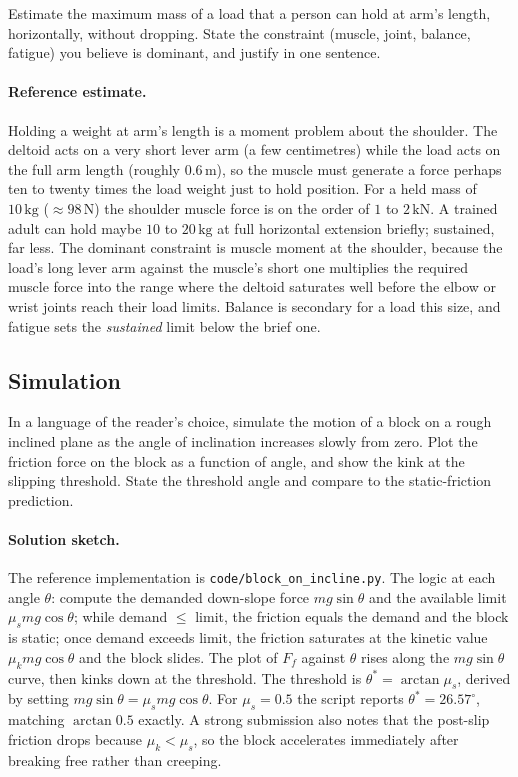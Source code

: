 \begin{exercise}
Estimate the maximum mass of a load that a person can hold at arm's
length, horizontally, without dropping. State the constraint
(muscle, joint, balance, fatigue) you believe is dominant, and
justify in one sentence.
\paragraph{Reference estimate.} Holding a weight at arm's length is a
moment problem about the shoulder. The deltoid acts on a very short
lever arm (a few centimetres) while the load acts on the full arm length
(roughly $0.6\,\si{\meter}$), so the muscle must generate a force perhaps
ten to twenty times the load weight just to hold position. For a held
mass of $10\,\si{\kilogram}$ ($\approx 98\,\text{N}$) the shoulder
muscle force is on the order of $1$ to $2\,\text{kN}$. A trained adult
can hold maybe $10$ to $20\,\si{\kilogram}$ at full horizontal extension
briefly; sustained, far less. The dominant constraint is muscle moment
at the shoulder, because the load's long lever arm against the muscle's
short one multiplies the required muscle force into the range where the
deltoid saturates well before the elbow or wrist joints reach their load
limits. Balance is secondary for a load this size, and fatigue sets the
\emph{sustained} limit below the brief one.
\end{exercise}

\subsection*{Simulation}

\begin{exercise}
In a language of the reader's choice, simulate the motion of a block
on a rough inclined plane as the angle of inclination increases
slowly from zero. Plot the friction force on the block as a function
of angle, and show the kink at the slipping threshold. State the
threshold angle and compare to the static-friction prediction.
\paragraph{Solution sketch.} The reference implementation is
\texttt{code/block\_on\_incline.py}. The logic at each angle $\theta$:
compute the demanded down-slope force $mg\sin\theta$ and the available
limit $\mu_s mg\cos\theta$; while demand $\le$ limit, the friction equals
the demand and the block is static; once demand exceeds limit, the
friction saturates at the kinetic value $\mu_k mg\cos\theta$ and the
block slides. The plot of $F_f$ against $\theta$ rises along the
$mg\sin\theta$ curve, then kinks down at the threshold. The threshold is
$\theta^\ast = \arctan\mu_s$, derived by setting $mg\sin\theta = \mu_s
mg\cos\theta$. For $\mu_s = 0.5$ the script reports $\theta^\ast =
26.57^{\circ}$, matching $\arctan 0.5$ exactly. A strong submission also
notes that the post-slip friction drops because $\mu_k < \mu_s$, so the
block accelerates immediately after breaking free rather than creeping.
\end{exercise}

